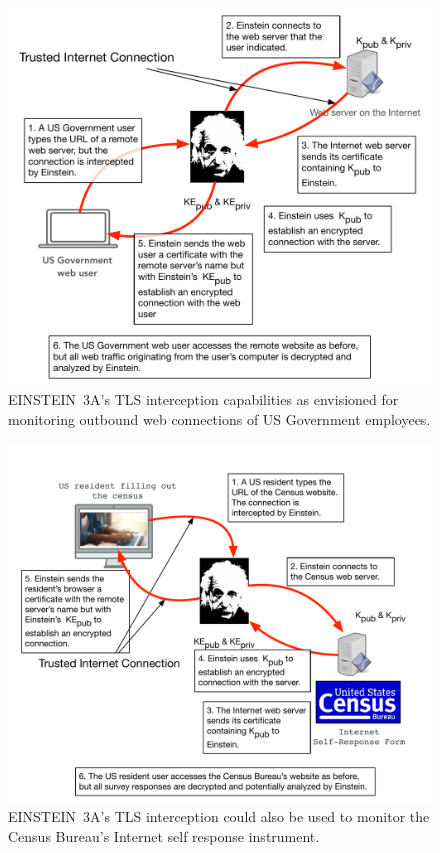 \documentclass[fleqn,10pt]{wlscirep}
\begin{document}
\begin{figure}
  \includegraphics[width=\textwidth]{art/emonitoring1.pdf}
  \caption{EINSTEIN~3A's TLS interception capabilities as envisioned
    for monitoring outbound web connections of US Government employees.}\label{emonitoring1}
  \end{figure}

\begin{figure}
  \includegraphics[width=\textwidth]{art/emonitoring2.pdf}
  \caption{EINSTEIN~3A's TLS interception could also be used to monitor the
    Census Bureau's Internet self response instrument.}\label{emonitoring2}
  \end{figure}
\end{document}
